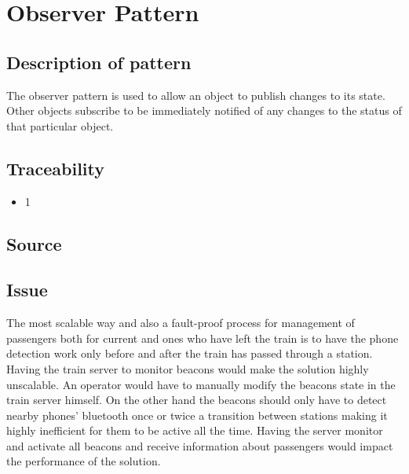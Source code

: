 
\section{Observer Pattern}

\subsection{Description of pattern}

	The observer pattern is used to allow an object to publish changes to its state. Other objects subscribe to be immediately notified of any changes to the status of that particular object. 

	
\iffalse
	USAGE : The main server will observe the state of train and Activate the beacons when train leaves a station . We don't need to have the beacons active when at a station 
beacons observe when phones are in range for establishing connections
\fi

\subsection{Traceability} 
	\begin{itemize}
		\item 1
	\end{itemize}

\subsection{Source} \cite{book:design-patterns}

\subsection{Issue} \label{observerP:issue}
	The most scalable way and also a fault-proof process for management of passengers both for current and ones who have left the train is to have the phone detection work only before and after the train has passed through a station. Having the train server to monitor beacons would make the solution highly unscalable. An operator would have to manually modify the beacons state in the train server himself. On the other hand the beacons should only have to detect nearby phones' bluetooth once or twice a transition between stations making it highly inefficient for them to be active all the time. Having the server monitor and activate all beacons and receive information about passengers would impact the performance of the solution. 

